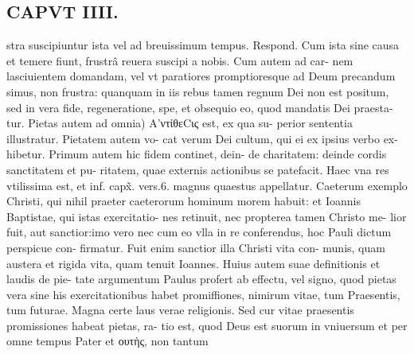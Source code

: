 \documentclass{article}
\begin{document}
\begin{pages}
\section*{CAPVT  IIII. }
\marginpar{[ p.211 ]}\pstart stra suscipiuntur ista vel ad breuissimum tempus. Respond. Cum ista sine causa et temere fiunt, frustrâ reuera suscipi a nobis. Cum autem ad car- nem lasciuientem domandam, vel vt paratiores promptioresque ad Deum precandum simus, non frustra: quanquam in iis rebus tamen regnum Dei non est positum, sed in vera fide, regeneratione, spe, et obsequio eo, quod mandatis Dei praesta- tur. Pietas autem ad omnia) Α'ντίθεCις est, ex qua su- perior sententia illustratur. Pietatem autem vo- cat verum Dei cultum, qui ei ex ipsius verbo ex- hibetur. Primum autem hic fidem continet, dein- de charitatem: deinde cordis sanctitatem et pu- ritatem, quae externis actionibus se patefacit. Haec vna res vtilissima est, et inf. capx̃. vers.6. magnus quaestus appellatur. Caeterum exemplo Christi, qui nihil praeter caeterorum hominum morem habuit: et Ioannis Baptistae, qui istas exercitatio- nes retinuit, nec propterea tamen Christo me- lior fuit, aut sanctior:imo vero nec cum eo vlla in re conferendus, hoc Pauli dictum perspicue con- firmatur. Fuit enim sanctior illa Christi vita con- munis, quam austera et rigida vita, quam tenuit Ioannes. Huius autem suae definitionis et laudis de pie- tate argumentum Paulus profert ab effectu, vel signo, quod pietas vera sine his exercitationibus habet promiffiones, nimirum vitae, tum Praesentis, tum futurae. Magna certe laus verae religionis. Sed cur vitae praesentis promissiones habeat pietas, ra- tio est, quod Deus est suorum in vniuersum et per omne tempus Pater et ουτὴς, non tantum  \pend

\end{pages}
\end{document}
